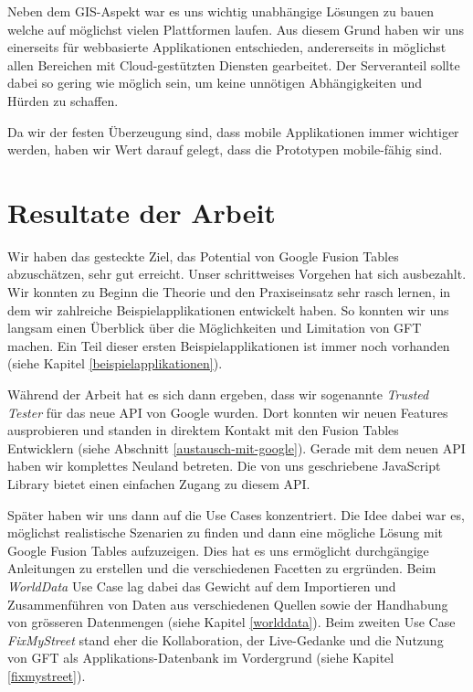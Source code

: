 Neben dem \gls{GIS}-Aspekt war es uns wichtig unabhängige Lösungen zu bauen welche auf möglichst vielen Plattformen laufen. Aus diesem Grund haben wir uns einerseits für webbasierte Applikationen entschieden, andererseits in möglichst allen Bereichen mit \gls{Cloud}-gestützten Diensten gearbeitet. Der Serveranteil sollte dabei so gering wie möglich sein, um keine unnötigen Abhängigkeiten und Hürden zu schaffen.

Da wir der festen Überzeugung sind, dass mobile Applikationen immer wichtiger werden, haben wir Wert darauf gelegt, dass die Prototypen mobile-fähig sind. 

\section{Resultate der Arbeit}
Wir haben das gesteckte Ziel, das Potential von Google Fusion Tables abzuschätzen, sehr gut erreicht. Unser schrittweises Vorgehen hat sich ausbezahlt. Wir konnten zu Beginn die Theorie und den Praxiseinsatz sehr rasch lernen, in dem wir zahlreiche Beispielapplikationen entwickelt haben. So konnten wir uns langsam einen Überblick über die Möglichkeiten und Limitation von GFT machen. Ein Teil dieser ersten Beispielapplikationen ist immer noch vorhanden (siehe Kapitel \ref{beispielapplikationen}).

Während der Arbeit hat es sich dann ergeben, dass wir sogenannte \emph{Trusted Tester} für das neue API von Google wurden. Dort konnten wir neuen Features ausprobieren und standen in direktem Kontakt mit den Fusion Tables Entwicklern (siehe Abschnitt \ref{austausch-mit-google}). Gerade mit dem neuen API haben wir komplettes Neuland betreten. Die von uns geschriebene JavaScript Library bietet einen einfachen Zugang zu diesem API.

Später haben wir uns dann auf die Use Cases konzentriert. Die Idee dabei war es, möglichst realistische Szenarien zu finden und dann eine mögliche Lösung mit Google Fusion Tables aufzuzeigen. Dies hat es uns ermöglicht durchgängige Anleitungen zu erstellen und die verschiedenen Facetten zu ergründen. Beim \emph{WorldData} Use Case lag dabei das Gewicht auf dem Importieren und Zusammenführen von Daten aus verschiedenen Quellen sowie der Handhabung von grösseren Datenmengen (siehe Kapitel \ref{worlddata}). Beim zweiten Use Case \emph{FixMyStreet} stand eher die Kollaboration, der Live-Gedanke und die Nutzung von GFT als Applikations-Datenbank im Vordergrund (siehe Kapitel \ref{fixmystreet}).

